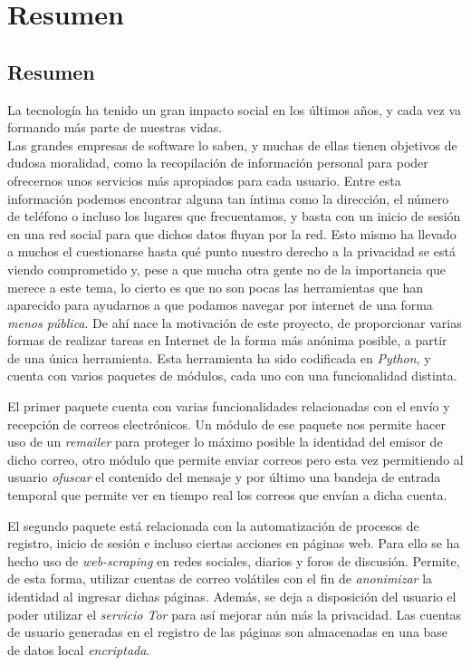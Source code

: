 \chapter*{Resumen}

\section*{Resumen}
La tecnología ha tenido un gran impacto social en los últimos años, y cada vez va formando más parte de nuestras vidas.\\
Las grandes empresas de software lo saben, y muchas de ellas tienen
objetivos de dudosa moralidad, como la recopilación de información
personal para poder ofrecernos unos servicios más apropiados para cada
usuario. Entre esta información podemos encontrar alguna tan íntima
como la dirección, el número de teléfono o incluso los lugares que
frecuentamos, y basta con un inicio de sesión en
una red social para que dichos datos fluyan por la red.  Esto mismo ha
llevado a muchos el cuestionarse hasta qué punto nuestro derecho a la
privacidad se está viendo comprometido y, pese a que mucha otra gente
no de la importancia que merece a este tema, lo cierto es que no son
pocas las herramientas que han aparecido para ayudarnos a que podamos
navegar por internet de una forma \textit{menos pública}.  De ahí nace
la motivación de este proyecto, de proporcionar varias formas de
realizar tareas en Internet de la forma más anónima posible, a partir
de una única herramienta. Esta herramienta ha sido codificada en
\textit{Python}, y cuenta con varios paquetes de módulos, cada uno con
una funcionalidad distinta.

El primer paquete cuenta con varias funcionalidades relacionadas con
el envío y recepción de correos electrónicos. Un módulo de ese paquete
nos permite hacer uso de un \textit{remailer} para proteger lo máximo
posible la identidad del emisor de dicho correo, otro módulo que
permite enviar correos pero esta vez permitiendo al usuario
\textit{ofuscar} el contenido del mensaje y por último una bandeja de
entrada temporal que permite ver en tiempo real los correos que envían
a dicha cuenta.

El segundo paquete está relacionada con la automatización de procesos
de registro, inicio de sesión e incluso ciertas acciones en páginas
web. Para ello se ha hecho uso de \textit{web-scraping} en redes
sociales, diarios y foros de discusión. Permite, de esta forma,
utilizar cuentas de correo volátiles con el fin de \textit{anonimizar}
la identidad al ingresar dichas páginas. Además, se deja a disposición
del usuario el poder utilizar el \textit{servicio Tor} para así
mejorar aún más la privacidad. Las cuentas de usuario generadas en el
registro de las páginas son almacenadas en una base de datos local
\textit{encriptada}.

